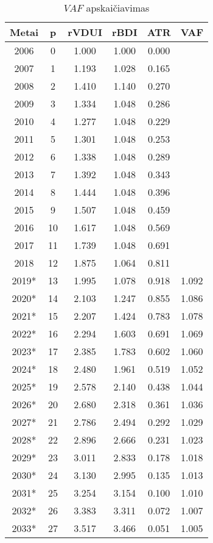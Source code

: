 \documentclass[titlepage, 11pt]{article}
\begin{document}
\begin{table}[H]
\begin{center}
\begin{tabular}{|c|c|c|c|c|c|}
\hline
Metai & p  & rVDUI & rBDI  & ATR   & VAF   \\ \hline
2006 & 0 & 1.000 & 1.000 & 0.000 &  \\ \hline
2007 & 1 & 1.193 & 1.028 & 0.165 &  \\ \hline
2008 & 2 & 1.410 & 1.140 & 0.270 &  \\ \hline
2009 & 3 & 1.334 & 1.048 & 0.286 &  \\ \hline
2010 & 4 & 1.277 & 1.048 & 0.229 &  \\ \hline
2011 & 5 & 1.301 & 1.048 & 0.253 &  \\ \hline
2012 & 6 & 1.338 & 1.048 & 0.289 &  \\ \hline
2013 & 7 & 1.392 & 1.048 & 0.343 &  \\ \hline
2014 & 8 & 1.444 & 1.048 & 0.396 &  \\ \hline
2015 & 9 & 1.507 & 1.048 & 0.459 &  \\ \hline
2016 & 10 & 1.617 & 1.048 & 0.569 &  \\ \hline
2017 & 11 & 1.739 & 1.048 & 0.691 &  \\ \hline
2018 & 12 & 1.875 & 1.064 & 0.811 &  \\ \hline
2019* & 13 & 1.995 & 1.078 & 0.918 & 1.092 \\ \hline
2020* & 14 & 2.103 & 1.247 & 0.855 & 1.086 \\ \hline
2021* & 15 & 2.207 & 1.424 & 0.783 & 1.078 \\ \hline
2022* & 16 & 2.294 & 1.603 & 0.691 & 1.069 \\ \hline
2023* & 17 & 2.385 & 1.783 & 0.602 & 1.060 \\ \hline
2024* & 18 & 2.480 & 1.961 & 0.519 & 1.052 \\ \hline
2025* & 19 & 2.578 & 2.140 & 0.438 & 1.044 \\ \hline
2026* & 20 & 2.680 & 2.318 & 0.361 & 1.036 \\ \hline
2027* & 21 & 2.786 & 2.494 & 0.292 & 1.029 \\ \hline
2028* & 22 & 2.896 & 2.666 & 0.231 & 1.023 \\ \hline
2029* & 23 & 3.011 & 2.833 & 0.178 & 1.018 \\ \hline
2030* & 24 & 3.130 & 2.995 & 0.135 & 1.013 \\ \hline
2031* & 25 & 3.254 & 3.154 & 0.100 & 1.010 \\ \hline
2032* & 26 & 3.383 & 3.311 & 0.072 & 1.007 \\ \hline
2033* & 27 & 3.517 & 3.466 & 0.051 & 1.005 \\ \hline
\end{tabular}
\caption{$VAF$ apskaičiavimas}
\end{center}
\end{table}
\end{document}
